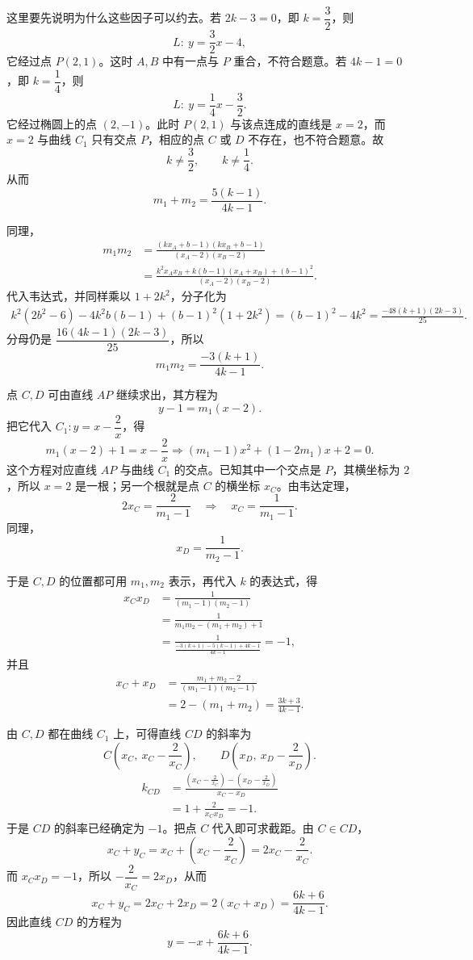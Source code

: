 \begin{solution}
这里要先说明为什么这些因子可以约去。若 $2k-3=0$，即 $k=\dfrac32$，则
\[
L:\ y=\frac32x-4,
\]
它经过点 $P(2,1)$。这时 $A,B$ 中有一点与 $P$ 重合，不符合题意。若 $4k-1=0$，即 $k=\dfrac14$，则
\[
L:\ y=\frac14x-\frac32.
\]
它经过椭圆上的点 $(2,-1)$。此时 $P(2,1)$ 与该点连成的直线是 $x=2$，而 $x=2$ 与曲线 $C_1$ 只有交点 $P$，相应的点 $C$ 或 $D$ 不存在，也不符合题意。故
\[
k\ne \frac32,\qquad k\ne \frac14.
\]
从而
\[
m_1+m_2=\frac{5(k-1)}{4k-1}.
\]

同理，
\begin{align*}
m_1m_2
&=\frac{(kx_A+b-1)(kx_B+b-1)}{(x_A-2)(x_B-2)}\\
&=\frac{k^2x_Ax_B+k(b-1)(x_A+x_B)+(b-1)^2}{(x_A-2)(x_B-2)}.
\end{align*}
代入韦达式，并同样乘以 $1+2k^2$，分子化为
\begin{align*}
k^2(2b^2-6)-4k^2b(b-1)+(b-1)^2(1+2k^2)
=(b-1)^2-4k^2
=\frac{-48(k+1)(2k-3)}{25}.
\end{align*}
分母仍是 $\dfrac{16(4k-1)(2k-3)}{25}$，所以
\[
m_1m_2=\frac{-3(k+1)}{4k-1}.
\]

点 $C,D$ 可由直线 $AP$ 继续求出，其方程为
\[
y-1=m_1(x-2).
\]
把它代入 $C_1:y=x-\dfrac2x$，得
\[
m_1(x-2)+1=x-\frac2x
\Longrightarrow
(m_1-1)x^2+(1-2m_1)x+2=0.
\]
这个方程对应直线 $AP$ 与曲线 $C_1$ 的交点。已知其中一个交点是 $P$，其横坐标为 $2$，所以 $x=2$ 是一根；另一个根就是点 $C$ 的横坐标 $x_C$。由韦达定理，
\[
2x_C=\frac{2}{m_1-1}
\quad\Longrightarrow\quad
x_C=\frac{1}{m_1-1}.
\]
同理，
\[
x_D=\frac{1}{m_2-1}.
\]

于是 $C,D$ 的位置都可用 $m_1,m_2$ 表示，再代入 $k$ 的表达式，得
\begin{align*}
x_Cx_D
&=\frac{1}{(m_1-1)(m_2-1)}\\
&=\frac{1}{m_1m_2-(m_1+m_2)+1}\\
&=\frac{1}{\frac{-3(k+1)-5(k-1)+4k-1}{4k-1}}
=-1,
\end{align*}
并且
\begin{align*}
x_C+x_D
&=\frac{m_1+m_2-2}{(m_1-1)(m_2-1)}\\
&=2-(m_1+m_2)
=\frac{3k+3}{4k-1}.
\end{align*}

由 $C,D$ 都在曲线 $C_1$ 上，可得直线 $CD$ 的斜率为
\[
C\left(x_C,\ x_C-\frac2{x_C}\right),\qquad
D\left(x_D,\ x_D-\frac2{x_D}\right).
\]
\begin{align*}
k_{CD}
&=\frac{\left(x_C-\frac2{x_C}\right)-\left(x_D-\frac2{x_D}\right)}{x_C-x_D}\\
&=1+\frac{2}{x_Cx_D}
=-1.
\end{align*}
于是 $CD$ 的斜率已经确定为 $-1$。把点 $C$ 代入即可求截距。由 $C\in CD$，
\[
x_C+y_C=x_C+\left(x_C-\frac2{x_C}\right)=2x_C-\frac2{x_C}.
\]
而 $x_Cx_D=-1$，所以 $-\dfrac2{x_C}=2x_D$，从而
\[
x_C+y_C=2x_C+2x_D=2(x_C+x_D)=\frac{6k+6}{4k-1}.
\]
因此直线 $CD$ 的方程为
\[
y=-x+\frac{6k+6}{4k-1}.
\]


\end{solution}
